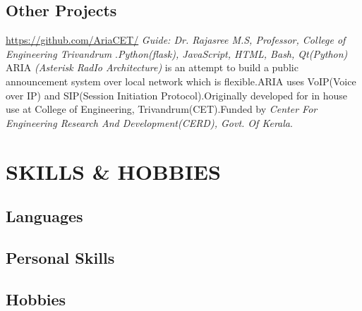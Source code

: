 \documentclass[11pt, a4paper, sans]{moderncv}
\begin{document}
\subsection{Other Projects}

{\newline \url{https://github.com/AriaCET/}}
{\newline \textit{Guide: Dr. Rajasree M.S, Professor, College of Engineering Trivandrum}}
{\newline.\hfill \textit{Python(flask), JavaScript, HTML, Bash, Qt(Python)}}
{ARIA \textit{(Asterisk RadIo Architecture)} is an attempt to build a public announcement system over local network which is flexible.ARIA uses VoIP(Voice over IP) and SIP(Session Initiation Protocol).Originally developed for in house use at College of Engineering, Trivandrum(CET).Funded by \textit{Center For Engineering Research And Development(CERD), Govt. Of Kerala}.\newline}

\section{SKILLS \& HOBBIES}
\subsection{Languages}
	           
\subsection{Personal Skills}
	          
\subsection{Hobbies}

\end{document}
